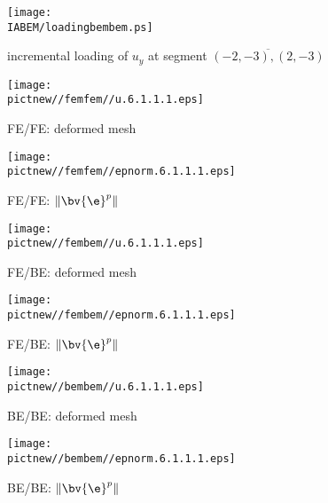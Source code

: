 \begin{figure}[h]
\begin{minipage}[c]{16cm}
\begin{center}
\texttt{[image: \\IABEM/loadingbembem.ps]}
\end{center}
\caption{incremental loading of $u_y$ at segment $\overline{(-2,-3),(2,-3)}$}\label{fig:IncrementalProcess}
\end{minipage} 
\end{figure}

\begin{figure} [h]
   \begin{minipage}{5.5cm}
   \begin{center}
\vspace*{5mm}
     \texttt{[image: \\pictnew//femfem//u.6.1.1.1.eps]}
\caption{ \label{fig:ElPlContEx12ffnet}  FE/FE: deformed mesh}
   \end{center}
   \end{minipage}
 \hspace*{20mm}
   \begin{minipage}{5.5cm}
   \begin{center}
     \texttt{[image: \\pictnew//femfem//epnorm.6.1.1.1.eps]}
\caption{ \label{fig:ElPlContEx12ffdev}  FE/FE: $\|\bv{\e}^p\|$ }
   \end{center}
   \end{minipage}

   \begin{minipage}{5.5cm}
   \begin{center}
\vspace*{5mm}
     \texttt{[image: \\pictnew//fembem//u.6.1.1.1.eps]}
\caption{ \label{fig:ElPlContEx12fbnet}  FE/BE: deformed mesh}
   \end{center}
   \end{minipage}
 \hspace*{20mm}
   \begin{minipage}{5.5cm}
   \begin{center}
     \texttt{[image: \\pictnew//fembem//epnorm.6.1.1.1.eps]}
\caption{ \label{fig:ElPlContEx12fbdev}  FE/BE: $\|\bv{\e}^p\|$ }
   \end{center}
   \end{minipage}

   \begin{minipage}{5.5cm}
   \begin{center}
\vspace*{5mm}
     \texttt{[image: \\pictnew//bembem//u.6.1.1.1.eps]}
\caption{ \label{fig:ElPlContEx12bbnet}  BE/BE: deformed mesh}
   \end{center}
   \end{minipage}
 \hspace*{20mm}
   \begin{minipage}{5.5cm}
   \begin{center}
     \texttt{[image: \\pictnew//bembem//epnorm.6.1.1.1.eps]}
\caption{ \label{fig:ElPlContEx12bbdev}  BE/BE: $\|\bv{\e}^p\|$ }
   \end{center}
   \end{minipage}
\end{figure}

